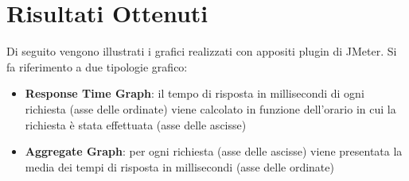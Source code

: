 
\section{Risultati Ottenuti}
Di seguito vengono illustrati i grafici realizzati con appositi plugin di JMeter. Si fa riferimento a due tipologie grafico:
\begin{itemize}
    \item \textbf{Response Time Graph}: il tempo di risposta in millisecondi di ogni richiesta (asse delle ordinate) viene calcolato in funzione dell'orario in cui la richiesta è stata effettuata (asse delle ascisse) 
    \item \textbf{Aggregate Graph}: per ogni richiesta (asse delle ascisse) viene presentata la media dei tempi di risposta in millisecondi (asse delle ordinate)
\end{itemize}

